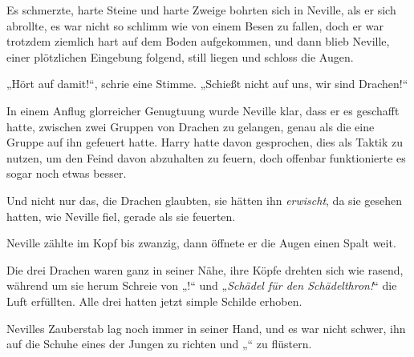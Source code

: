 Es schmerzte, harte Steine und harte Zweige bohrten sich in Neville, als er sich abrollte, es war nicht so schlimm wie von einem Besen zu fallen, doch er war trotzdem ziemlich hart auf dem Boden aufgekommen, und dann blieb Neville, einer plötzlichen Eingebung folgend, still liegen und schloss die Augen.

„Hört auf damit!“, schrie eine Stimme.
„Schießt nicht auf uns, wir sind Drachen!“

In einem Anflug glorreicher Genugtuung wurde Neville klar, dass er es geschafft hatte, zwischen zwei Gruppen von Drachen zu gelangen, genau als die eine Gruppe auf ihn gefeuert hatte. Harry hatte davon gesprochen, dies als Taktik zu nutzen, um den Feind davon abzuhalten zu feuern, doch offenbar funktionierte es sogar noch etwas besser.

Und nicht nur das, die Drachen glaubten, sie hätten ihn \emph{erwischt}, da sie gesehen hatten, wie Neville fiel, gerade als sie feuerten.

Neville zählte im Kopf bis zwanzig, dann öffnete er die Augen einen Spalt weit.

Die drei Drachen waren ganz in seiner Nähe, ihre Köpfe drehten sich wie rasend, während um sie herum Schreie von „!“ und „\emph{Schädel für den Schädelthron!}“ die Luft erfüllten. Alle drei hatten jetzt simple Schilde erhoben.

Nevilles Zauberstab lag noch immer in seiner Hand, und es war nicht schwer, ihn auf die Schuhe eines der Jungen zu richten und „“ zu flüstern.

